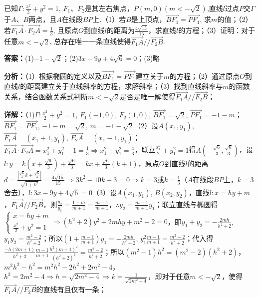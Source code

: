 \begin{question}[points=16]
已知$\Gamma:\frac{x^2}{2}+y^2=1$, $F_1$、$F_2$是其左右焦点，$P(m,0)(m<-\sqrt{2})$,直线$l$过点$P$交$\Gamma$于$A$、$B$两点，且$A$在线段$BP$上.（1）若$B$是上顶点，$\overrightarrow{BF_1}=\overrightarrow{PF_1}$, 求$m$的值；（2）若$\overrightarrow{F_1A}\cdot\overrightarrow{F_2A}=\frac{1}{3}$, 且原点$O$到直线$l$的距离为$\frac{4\sqrt{15}}{15}$，求直线$l$的方程；（3）证明：对于任意$m<-\sqrt{2}$, 总存在唯一一条直线使得$\overrightarrow{F_1A}//\overrightarrow{F_2B}$.
\begin{solution}
\textbf{答案：}(1)$-1-\sqrt{2}$；(2)$3x-9y+4\sqrt{6}=0$；(3)略

\textbf{分析：}（1）根据椭圆的定义以及$\overrightarrow{BF_1}=\overrightarrow{PF_1}$建立关于$m$的方程；（2）通过原点$O$到直线$l$的距离建立关于直线斜率的方程，求解斜率；（3）找到直线斜率与$m$的函数关系，结合函数关系式判断$m<-\sqrt{2}$是否是唯一解使得$\overrightarrow{F_1A}//\overrightarrow{F_2B}$；

\textbf{详解：}（1)$\Gamma:\frac{x^2}{2}+y^2=1$, $F_1(-1,0)$, $F_2(1,0)$, $\overrightarrow{BF_1}=\sqrt{2}$, $\overrightarrow{PF_1}=-1-m$；$\overrightarrow{BF_1}=\overrightarrow{PF_1}$, $-1-m=\sqrt{2}$, $m=-1-\sqrt{2}$（2）设$A(x_1,y_1)$, $\overrightarrow{F_1A}=(x_1+1,y_1)$, $\overrightarrow{F_2A}=(x_1-1,y_1)$；$\overrightarrow{F_1A}\cdot\overrightarrow{F_2A}=x_1^2+y_1^2-1=\frac{1}{3}\Rightarrow x_1^2+y_1^2=\frac{4}{3}$，联立$\frac{x_1^2}{2}+y_1^2=1$得$A(-\frac{\sqrt{6}}{3},\frac{\sqrt{6}}{3})$，设$l:y=k(x+\frac{\sqrt{6}}{3})+\frac{\sqrt{6}}{3}=kx+\frac{\sqrt{6}}{3}(k+1)$，原点$O$到直线$l$的距离$d=\frac{|\frac{\sqrt{6}}{3}k+\frac{\sqrt{6}}{3}|}{\sqrt{1+k^2}}=\frac{4\sqrt{15}}{15}\Rightarrow3k^2-10k+3=0\Rightarrow k=3$或$k=\frac{1}{3}$（$A$在线段$BP$上，$k=3$舍去），$l:3x-9y+4\sqrt{6}=0$（3）设$A(x_1,y_1)$, $B(x_2,y_2)$，直线$l:x=hy+m$，$\overrightarrow{F_1A}//\overrightarrow{F_2B}$，则$\frac{y_2}{y_1}=\frac{1-m}{m+1}=\frac{m-1}{m+1}$，$\therefore y_2=\frac{m-1}{m+1}y_1$；联立直线与椭圆得$\begin{cases}x=hy+m\\\frac{x^2}{2}+y^2=1\end{cases}\Rightarrow(h^2+2)y^2+2mhy+m^2-2=0$，即$y_1+y_2=-\frac{2mh}{h^2+2}$, $y_1y_2=\frac{m^2-2}{h^2+2}$；所以$(1+\frac{m-1}{m+1})y_1=-\frac{2mh}{h^2+2}$, $y_1^2\frac{m-1}{m+1}=\frac{m^2-2}{h^2+2}$；代入得$\frac{-h(2m+1)}{h^2+2}\frac{m-1}{m+1}\frac{h^2(m+1)^2}{(h^2+2)^2}=\frac{m^2-2}{h^2+2}$；所以$(m^2-1)h^2=(m^2-2)(h^2+2)$，$m^2h^2-h^2=m^2h^2-2h^2+2m^2-4$，$h^2=2m^2-4\Rightarrow h=\sqrt{2m^2-4}\Rightarrow k=\frac{1}{\sqrt{2m^2-4}}$，即对于任意$m<-\sqrt{2}$，使得$\overrightarrow{F_1A}//\overrightarrow{F_2B}$的直线有且仅有一条；
\end{solution}
\end{question}

